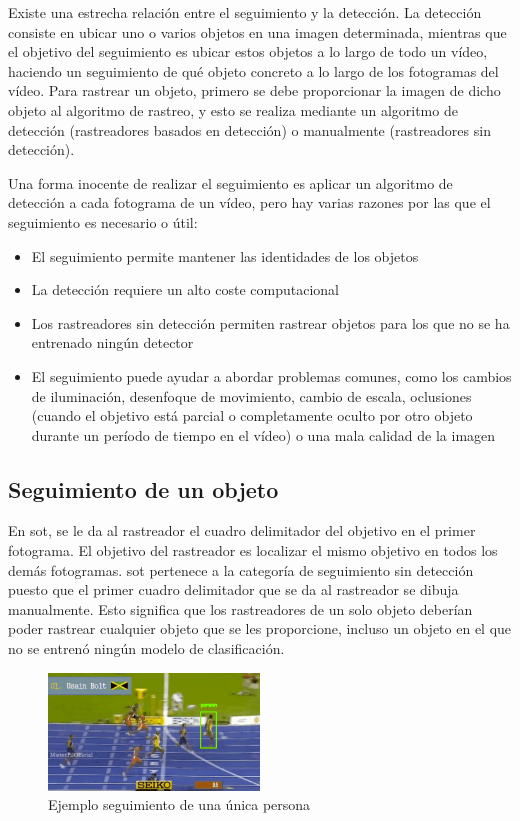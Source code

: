 Existe una estrecha relación entre el seguimiento y la detección. La detección consiste en ubicar uno o varios objetos en una imagen determinada, mientras que el objetivo del seguimiento es ubicar estos objetos a lo largo de todo un vídeo, haciendo un seguimiento de qué objeto concreto a lo largo de los fotogramas del vídeo. Para rastrear un objeto, primero se debe proporcionar la imagen de dicho objeto al algoritmo de rastreo, y esto se realiza mediante un algoritmo de detección (rastreadores basados en detección) o manualmente (rastreadores sin detección).

Una forma inocente de realizar el seguimiento es aplicar un algoritmo de detección a cada fotograma de un vídeo, pero hay varias razones por las que el seguimiento es necesario o útil:
\begin{itemize}
    \item El seguimiento permite mantener las identidades de los objetos
    \item La detección requiere un alto coste computacional
    \item Los rastreadores sin detección permiten rastrear objetos para los que no se ha entrenado ningún detector
    \item El seguimiento puede ayudar a abordar problemas comunes, como los  cambios de iluminación, desenfoque de movimiento, cambio de escala, oclusiones (cuando el objetivo está parcial o completamente oculto por otro objeto durante un período de tiempo en el vídeo) o una mala calidad de la imagen
\end{itemize}

\subsection{Seguimiento de un objeto}
\label{subsec:seguimiento-un-objeto}

En \gls{sot}, se le da al rastreador el cuadro delimitador del objetivo en el primer fotograma. El objetivo del rastreador es localizar el mismo objetivo en todos los demás fotogramas. \gls{sot} pertenece a la categoría de seguimiento sin detección puesto que el primer cuadro delimitador que se da al rastreador se dibuja manualmente. Esto significa que los rastreadores de un solo objeto deberían poder rastrear cualquier objeto que se les proporcione, incluso un objeto en el que no se entrenó ningún modelo de clasificación.

\begin{figure}[ht]
\centering
\includegraphics[width=0.5\textwidth]{img/chapters/estado-del-arte/sot-usain-bolt.png}
\caption{\label{fig:sot-usain-bolt}Ejemplo seguimiento de una única persona}
\end{figure}

